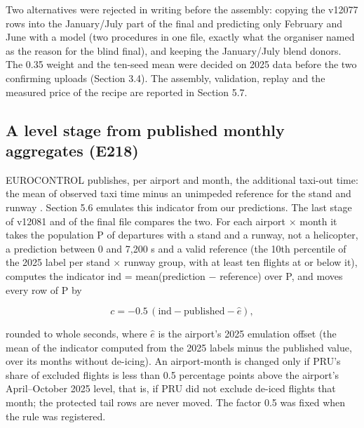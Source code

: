 \documentclass[11pt,a4paper]{article}
\begin{document}
Two alternatives were rejected in writing before the assembly: copying the v12077 rows into the January/July part of the final and predicting only February and June with a model (two procedures in one file, exactly what the organiser named as the reason for the blind final), and keeping the January/July blend donors. The 0.35 weight and the ten-seed mean were decided on 2025 data before the two confirming uploads (Section 3.4). The assembly, validation, replay and the measured price of the recipe are reported in Section 5.7.

\subsection{A level stage from published monthly aggregates (E218)}\label{a-level-stage-from-published-monthly-aggregates-e218}

EUROCONTROL publishes, per airport and month, the additional taxi-out time: the mean of observed taxi time minus an unimpeded reference for the stand and runway \autocite{eurocontrol2023atxot,eurocontrol2026atxotdata}. Section 5.6 emulates this indicator from our predictions. The last stage of v12081 and of the final file compares the two. For each airport $\times$ month it takes the population P of departures with a stand and a runway, not a helicopter, a prediction between 0 and 7,200 s and a valid reference (the 10th percentile of the 2025 label per stand $\times$ runway group, with at least ten flights at or below it), computes the indicator \(\mathrm{ind}\) = mean(prediction $-$ reference) over P, and moves every row of P by

\begin{equation}c = -0.5\,(\mathrm{ind} - \mathrm{published} - \hat e),\end{equation}

rounded to whole seconds, where \(\hat e\) is the airport's 2025 emulation offset (the mean of the indicator computed from the 2025 labels minus the published value, over its months without de-icing). An airport-month is changed only if PRU's share of excluded flights is less than 0.5 percentage points above the airport's April--October 2025 level, that is, if PRU did not exclude de-iced flights that month; the protected tail rows are never moved. The factor 0.5 was fixed when the rule was registered.
\end{document}
